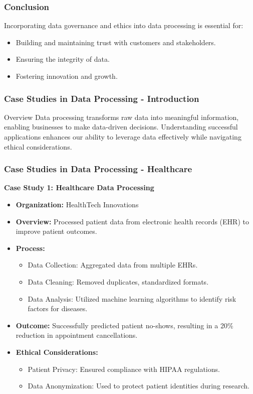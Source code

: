 \documentclass[aspectratio=169]{beamer}
\begin{document}
\begin{frame}[fragile]
    \frametitle{Conclusion}
    Incorporating data governance and ethics into data processing is essential for:
    \begin{itemize}
        \item Building and maintaining trust with customers and stakeholders.
        \item Ensuring the integrity of data.
        \item Fostering innovation and growth.
    \end{itemize}
\end{frame}

\begin{frame}[fragile]
    \frametitle{Case Studies in Data Processing - Introduction}
    \begin{block}{Overview}
        Data processing transforms raw data into meaningful information, enabling businesses to make data-driven decisions. Understanding successful applications enhances our ability to leverage data effectively while navigating ethical considerations.
    \end{block}
\end{frame}

\begin{frame}[fragile]
    \frametitle{Case Studies in Data Processing - Healthcare}
    \textbf{Case Study 1: Healthcare Data Processing}  
    \begin{itemize}
        \item \textbf{Organization:} HealthTech Innovations
        \item \textbf{Overview:} Processed patient data from electronic health records (EHR) to improve patient outcomes.
        \item \textbf{Process:}
            \begin{itemize}
                \item Data Collection: Aggregated data from multiple EHRs.
                \item Data Cleaning: Removed duplicates, standardized formats.
                \item Data Analysis: Utilized machine learning algorithms to identify risk factors for diseases.
            \end{itemize}
        \item \textbf{Outcome:} Successfully predicted patient no-shows, resulting in a 20\% reduction in appointment cancellations.
        \item \textbf{Ethical Considerations:}
            \begin{itemize}
                \item Patient Privacy: Ensured compliance with HIPAA regulations.
                \item Data Anonymization: Used to protect patient identities during research.
            \end{itemize}
    \end{itemize}
\end{frame}
\end{document}
